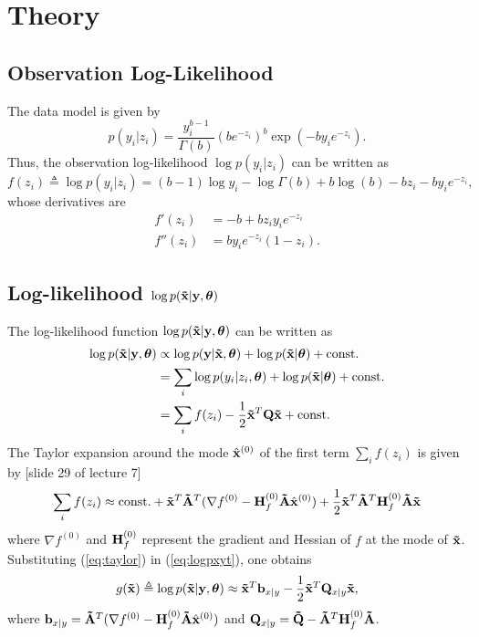 \documentclass[a4paper,10pt]{article}
\def\bH{{\bf H}}
\def\bQ{{\bf Q}}
\def\btQ{{\bf \tilde Q}}
\def\btA{{\bf \tilde A}}
\def\bx{{\bf x}}
\def\bb{{\bf b}}
\def\by{{\bf y}}
\def\btx{{\bf{\tilde x}}}
\def\btheta{{\boldsymbol \theta}}
\begin{document}
\section{Theory}
\subsection{Observation Log-Likelihood}
The data model is given by
\begin{equation}
 p(y_i|z_i) = \frac{y_i^{b-1}}{\Gamma(b)} (be^{-z_i})^b \exp (-by_ie^{-z_i}).
 \label{eq:datamodel}
\end{equation}
Thus, the observation log-likelihood $\log p(y_i|z_i)$ can be written as
\begin{equation*}
 f(z_i) \triangleq \log p(y_i|z_i) = (b-1) \log y_i - \log \Gamma(b) + b \log (b) - b z_i - b y_i e^{-z_i},
\end{equation*}
whose derivatives are
\begin{align*}
 f'(z_i) &= -b + b z_i y_i e^{-z_i} \\
 f''(z_i) &= b y_i e^{-z_i} (1 - z_i) .
\end{align*}

\subsection{Log-likelihood $\log p(\btx|\by, \btheta)$}
The log-likelihood function $\log p(\btx|\by, \btheta)$ can be written as
\begin{align}
 \log p(\btx|\by, \btheta) &\propto \log p(\by| \btx, \btheta) + \log p(\btx|\btheta) + \mathrm{const.} \nonumber \\
 &= \sum_i \log p(y_i|z_i, \btheta) + \log p(\btx|\btheta) + \mathrm{const.} \nonumber \\
 &= \sum_i f(z_i) - \frac{1}{2} \btx^T \bQ \btx  + \mathrm{const.}
 \label{eq:logpxyt}
\end{align}
The Taylor expansion around the mode $\hat \bx^{(0)}$ of the first term $\sum_i f(z_i)$ is given by [slide 29 of lecture 7]
\begin{equation}
 \sum_i f(z_i) \approx \mathrm{const.} + \btx^T \btA^T (\nabla f^{(0)} - \bH_f^{(0)} \btA \hat \bx^{(0)}) + \frac{1}{2} \btx^T \btA^T \bH_f^{(0)} \btA \btx
 \label{eq:taylor}
\end{equation}
where $\nabla f^{(0)}$ and $\bH_f^{(0)}$ represent the gradient and Hessian of $f$ at the mode of $\btx$.
Substituting (\ref{eq:taylor}) in (\ref{eq:logpxyt}), one obtains
\begin{equation}
 g(\btx) \triangleq \log p(\btx|\by, \btheta) \approx \btx^T \bb_{x|y} - \frac{1}{2} \btx^T \bQ_{x|y} \btx,
 \label{eq:gx}
\end{equation}
where $\bb_{x|y} = \btA^T (\nabla f^{(0)} - \bH_f^{(0)} \btA \hat \bx^{(0)})$ and $\bQ_{x|y} = \btQ - \btA^T \bH_f^{(0)} \btA$.
\end{document}
